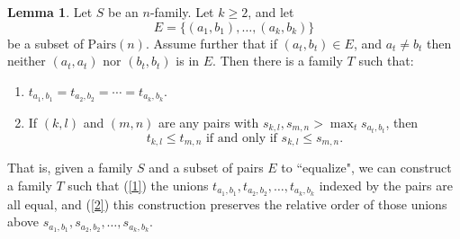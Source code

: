 \documentclass[12pt]{article}
\theoremstyle{definition}
\newtheorem{lemma}[theorem]{Lemma}
\newcommand{\set}[1]{\{ #1 \}}
\newcommand{\Pairs}{\mbox{Pairs}}
\begin{document}
\begin{lemma}
Let $S$ be an $n$-family.  Let $k\geq 2$, and let 
\[E = \set{(a_1,b_1), \ldots, (a_k,b_k)}\]
be a subset of $\Pairs(n)$.
Assume further that if $(a_t, b_t) \in E$, and $a_t \ne b_t$ 
then neither $(a_t,a_t)$ nor $(b_t,b_t)$ is in $E$. 
Then there is a family $T$ such that:
\begin{enumerate}
    \item \label{1} $t_{a_1, b_1} = t_{a_2, b_2} = \cdots = t_{a_k, b_k}$.
    \item \label{2} If $(k,l)$ and $(m,n)$ are any pairs with $s_{k,l}, s_{m,n} >
    \max_t s_{a_t,b_t}$,
    then 
    \[ \mbox{$t_{k,l} \leq t_{m,n} $ if and only if $s_{k,l} \leq s_{m,n} $}.\]
\label{equalize2}
\end{enumerate}
\label{lemma-equalize}
\end{lemma}

That is, given a family $S$ and a subset of pairs $E$ to ``equalize", we can construct a family $T$ such that (\ref{1}) the unions $t_{a_1, b_1}, t_{a_2, b_2}, \ldots, t_{a_k, b_k}$ indexed by the pairs are all equal, and (\ref{2}) this construction preserves the relative order of those unions above $s_{a_1, b_1}, s_{a_2, b_2}, \ldots, s_{a_k, b_k}$.
\end{document}

